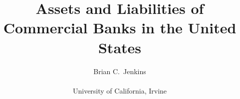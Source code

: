 \documentclass[x11names]{beamer}
\title[Bank Assets and Liabilities\hspace{2em}\insertframenumber/
\inserttotalframenumber]{Assets and Liabilities of Commercial Banks in the United States}
\author{Brian C.~Jenkins \\ ~ \\University of California, Irvine}
\begin{document}
\frame{\maketitle}








\end{document}
